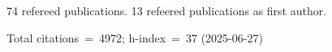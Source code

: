 74 refereed publications. 13 refeered publications as first author.

Total citations~=~4972; h-index~=~37 (2025-06-27)